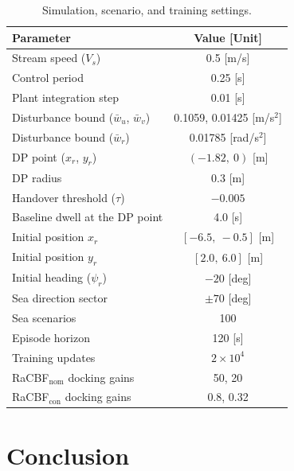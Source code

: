 \documentclass[5p,times,authoryear]{elsarticle}
\begin{document}
\begin{table}
\centering
\renewcommand{\arraystretch}{1.2}
\caption{Simulation, scenario, and training settings.}
\label{tab_sim}
\begin{tabular}{lc}
\hline
\textbf{Parameter} & \textbf{Value [Unit]} \\ \hline
Stream speed ($V_s$)                          & 0.5 [m/s] \\
Control period                                & 0.25 [s] \\
Plant integration step                        & 0.01 [s] \\
Disturbance bound ($\bar w_u$, $\bar w_v$)    & 0.1059, 0.01425 [m/s$^2$] \\
Disturbance bound ($\bar w_r$)                & 0.01785 [rad/s$^2$] \\
DP point ($x_r$, $y_r$)                       & $(-1.82,\ 0)$ [m] \\
DP radius                                     & 0.3 [m] \\
Handover threshold ($\tau$)                   & $-0.005$ \\
Baseline dwell at the DP point                & 4.0 [s] \\
Initial position $x_r$                        & $[-6.5,\ -0.5]$ [m] \\
Initial position $y_r$                        & $[2.0,\ 6.0]$ [m] \\
Initial heading ($\psi_r$)                    & $-20$ [deg] \\
Sea direction sector                          & $\pm 70$ [deg] \\
Sea scenarios                                 & 100 \\
Episode horizon                               & 120 [s] \\
Training updates                              & $2\times 10^{4}$ \\
RaCBF$_{\mathrm{nom}}$ docking gains           & 50, 20 \\
RaCBF$_{\mathrm{con}}$ docking gains           & 0.8, 0.32 \\
\hline
\end{tabular}
\end{table}

\section{Conclusion}\label{sec_conclusion}
\end{document}
